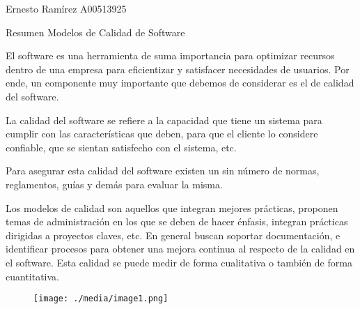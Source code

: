 \documentclass[12pt]{article}
\begin{document}
Ernesto Ramírez A00513925\par

Resumen Modelos de Calidad de Software\par

\setlength{\parskip}{0.0pt}
El software es una herramienta de suma importancia para optimizar recursos dentro de una empresa para eficientizar y satisfacer necesidades de usuarios. Por ende, un componente muy importante que debemos de considerar es el de calidad del software.\par


\vspace{\baselineskip}
La calidad del software se refiere a la capacidad que tiene un sistema para cumplir con las características que deben, para que el cliente lo considere confiable, que se sientan satisfecho con el sistema, etc. \par


\vspace{\baselineskip}
Para asegurar esta calidad del software existen un sin número de normas, reglamentos, guías y demás para evaluar la misma.\par


\vspace{\baselineskip}
Los modelos de calidad son aquellos que integran mejores prácticas, proponen temas de administración en los que se deben de hacer énfasis, integran prácticas dirigidas a proyectos claves, etc. En general buscan soportar documentación, e identificar procesos para obtener una mejora continua al respecto de la calidad en el software. Esta calidad se puede medir de forma cualitativa o también de forma cuantitativa. \par


\vspace{\baselineskip}



\begin{figure}[H]
\advance\leftskip 1.31in		\texttt{[image: ./media/image1.png]}
\end{figure}



\par


\vspace{\baselineskip}

\vspace{\baselineskip}
\end{document}
